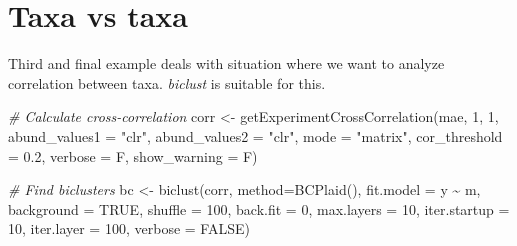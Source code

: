 \documentclass[
]{book}
\newenvironment{Shaded}{\begin{snugshade}}{\end{snugshade}}
\newcommand{\AttributeTok}[1]{\textcolor[rgb]{0.77,0.63,0.00}{#1}}
\newcommand{\CommentTok}[1]{\textcolor[rgb]{0.56,0.35,0.01}{\textit{#1}}}
\newcommand{\ConstantTok}[1]{\textcolor[rgb]{0.00,0.00,0.00}{#1}}
\newcommand{\DecValTok}[1]{\textcolor[rgb]{0.00,0.00,0.81}{#1}}
\newcommand{\FloatTok}[1]{\textcolor[rgb]{0.00,0.00,0.81}{#1}}
\newcommand{\FunctionTok}[1]{\textcolor[rgb]{0.00,0.00,0.00}{#1}}
\newcommand{\NormalTok}[1]{#1}
\newcommand{\OtherTok}[1]{\textcolor[rgb]{0.56,0.35,0.01}{#1}}
\newcommand{\SpecialCharTok}[1]{\textcolor[rgb]{0.00,0.00,0.00}{#1}}
\newcommand{\StringTok}[1]{\textcolor[rgb]{0.31,0.60,0.02}{#1}}
\begin{document}
\hypertarget{taxa-vs-taxa}{%
\section{Taxa vs taxa}\label{taxa-vs-taxa}}

Third and final example deals with situation where we want to analyze correlation
between taxa. \emph{biclust} is suitable for this.

\begin{Shaded}
\begin{Highlighting}[]
\CommentTok{\# Calculate cross{-}correlation}
\NormalTok{corr }\OtherTok{\textless{}{-}} \FunctionTok{getExperimentCrossCorrelation}\NormalTok{(mae, }\DecValTok{1}\NormalTok{, }\DecValTok{1}\NormalTok{, }
                                      \AttributeTok{abund\_values1 =} \StringTok{"clr"}\NormalTok{, }\AttributeTok{abund\_values2 =} \StringTok{"clr"}\NormalTok{, }
                                      \AttributeTok{mode =} \StringTok{"matrix"}\NormalTok{,}
                                      \AttributeTok{cor\_threshold =} \FloatTok{0.2}\NormalTok{, }\AttributeTok{verbose =}\NormalTok{ F, }\AttributeTok{show\_warning =}\NormalTok{ F)}

\CommentTok{\# Find biclusters}
\NormalTok{bc }\OtherTok{\textless{}{-}} \FunctionTok{biclust}\NormalTok{(corr, }\AttributeTok{method=}\FunctionTok{BCPlaid}\NormalTok{(), }\AttributeTok{fit.model =}\NormalTok{ y }\SpecialCharTok{\textasciitilde{}}\NormalTok{ m,}
              \AttributeTok{background =} \ConstantTok{TRUE}\NormalTok{, }\AttributeTok{shuffle =} \DecValTok{100}\NormalTok{, }\AttributeTok{back.fit =} \DecValTok{0}\NormalTok{, }\AttributeTok{max.layers =} \DecValTok{10}\NormalTok{,}
              \AttributeTok{iter.startup =} \DecValTok{10}\NormalTok{, }\AttributeTok{iter.layer =} \DecValTok{100}\NormalTok{, }\AttributeTok{verbose =} \ConstantTok{FALSE}\NormalTok{)}
\end{Highlighting}
\end{Shaded}

\begin{Shaded}
\end{Shaded}
\end{document}
